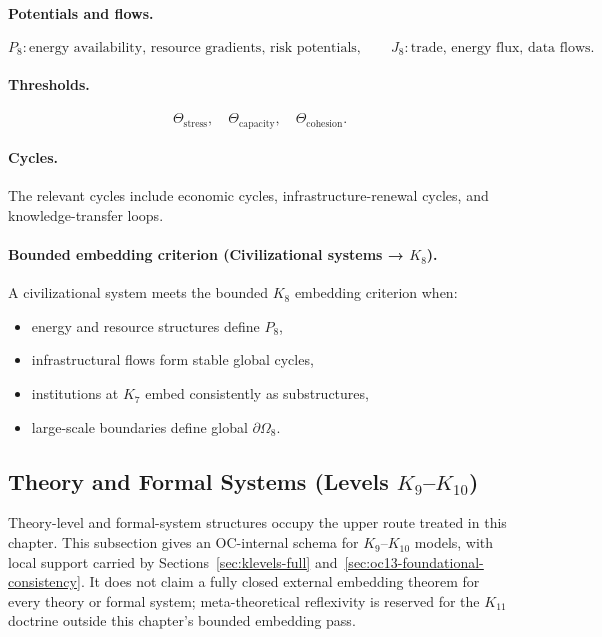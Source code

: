 \paragraph{Potentials and flows.}
\[
  P_8: \text{energy availability, resource gradients, risk potentials},\qquad
  J_8: \text{trade, energy flux, data flows}.
\]

\paragraph{Thresholds.}
\[
  \Theta_{\mathrm{stress}},\quad
  \Theta_{\mathrm{capacity}},\quad
  \Theta_{\mathrm{cohesion}}.
\]

\paragraph{Cycles.}
The relevant cycles include economic cycles, infrastructure-renewal cycles,
and knowledge-transfer loops.

\paragraph{Bounded embedding criterion (Civilizational systems → \texorpdfstring{\(K_8\)}{K8}).}
A civilizational system meets the bounded \(K_8\) embedding criterion when:
\begin{itemize}
  \item energy and resource structures define \(P_8\),
  \item infrastructural flows form stable global cycles,
  \item institutions at \(K_7\) embed consistently as substructures,
  \item large-scale boundaries define global \(\partial\Omega_8\).
\end{itemize}

\subsection{Theory and Formal Systems (Levels \texorpdfstring{$K_9$}{K9}--\texorpdfstring{$K_{10}$}{K10})}

Theory-level and formal-system structures occupy the upper route treated in
this chapter. This subsection gives an OC-internal schema for \(K_9\)--\(K_{10}\)
models, with local support carried by Sections~\ref{sec:klevels-full}
and~\ref{sec:oc13-foundational-consistency}. It does not claim a fully closed
external embedding theorem for every theory or formal system; meta-theoretical
reflexivity is reserved for the \(K_{11}\) doctrine outside this chapter's
bounded embedding pass.

